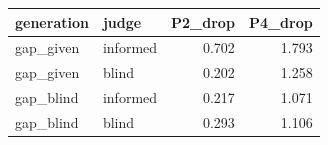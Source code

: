 \begin{tabular}{llrr}
\toprule
generation & judge & P2_drop & P4_drop \\
\midrule
gap_given & informed & 0.702 & 1.793 \\
gap_given & blind & 0.202 & 1.258 \\
gap_blind & informed & 0.217 & 1.071 \\
gap_blind & blind & 0.293 & 1.106 \\
\bottomrule
\end{tabular}
